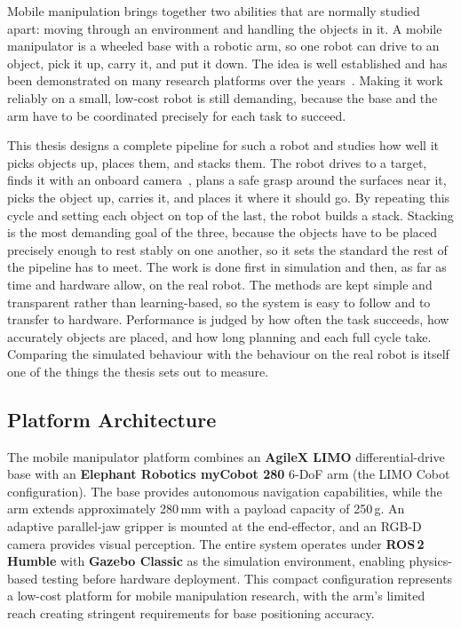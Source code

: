 \documentclass[11pt,a4paper]{article}
\begin{document}
Mobile manipulation brings together two abilities that are normally studied apart:
moving through an environment and handling the objects in it.
A mobile manipulator is a wheeled base with a robotic arm, so one robot can drive to
an object, pick it up, carry it, and put it down.
The idea is well established and has been demonstrated on many research platforms over
the years~\cite{masannek2026eaiws}.
Making it work reliably on a small, low-cost robot is still demanding, because the base
and the arm have to be coordinated precisely for each task to succeed.

This thesis designs a complete pipeline for such a robot and studies how well it picks
objects up, places them, and stacks them.
The robot drives to a target, finds it with an onboard camera~\cite{chaumette2006visual},
plans a safe grasp around the surfaces near it, picks the object up, carries it, and
places it where it should go.
By repeating this cycle and setting each object on top of the last, the robot builds a
stack.
Stacking is the most demanding goal of the three, because the objects have to be placed
precisely enough to rest stably on one another, so it sets the standard the rest of the
pipeline has to meet.
The work is done first in simulation and then, as far as time and hardware allow, on
the real robot.
The methods are kept simple and transparent rather than learning-based, so the system
is easy to follow and to transfer to hardware.
Performance is judged by how often the task succeeds, how accurately objects are
placed, and how long planning and each full cycle take.
Comparing the simulated behaviour with the behaviour on the real robot is itself one of
the things the thesis sets out to measure.

\subsection{Platform Architecture}

The mobile manipulator platform combines an \textbf{AgileX LIMO} differential-drive
base with an \textbf{Elephant Robotics myCobot 280} 6-DoF arm (the LIMO Cobot
configuration).
The base provides autonomous navigation capabilities, while the arm extends
approximately 280\,mm with a payload capacity of 250\,g.
An adaptive parallel-jaw gripper is mounted at the end-effector, and an RGB-D camera
provides visual perception.
The entire system operates under \textbf{ROS\,2 Humble} with \textbf{Gazebo Classic}
as the simulation environment, enabling physics-based testing before hardware
deployment.
This compact configuration represents a low-cost platform for mobile manipulation
research, with the arm's limited reach creating stringent requirements for base
positioning accuracy.
\end{document}
